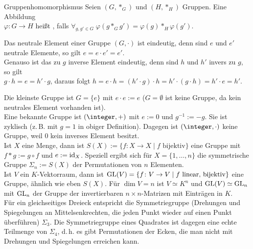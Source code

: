 \begin{Def}{Gruppenhomomorphismus}
    Seien $(G, \ast_G)$ und $(H, \ast_H)$ Gruppen.
    Eine Abbildung\\
    $\varphi\colon G \rightarrow H$ heißt
    , falls $\forall_{g, g' \in G}\;
    \varphi(g \ast_G g') = \varphi(g) \ast_H \varphi(g')$.
\end{Def}

\begin{Bem}
    Das neutrale Element einer Gruppe $(G, \cdot)$ ist eindeutig, denn
    sind $e$ und $e'$ neutrale Elemente, so gilt $e = e \cdot e' = e'$.\\
    Genauso ist das zu $g$ inverse Element eindeutig,
    denn sind $h$ und $h'$ invers zu $g$, so gilt\\
    $g \cdot h = e = h' \cdot g$, daraus folgt
    $h = e \cdot h = (h' \cdot g) \cdot h =
    h' \cdot (g \cdot h) = h' \cdot e = h'$.
\end{Bem}

\linie

\begin{Bsp}
    Die kleinste Gruppe ist $G = \{e\}$ mit $e \cdot e := e$
    ($G = \emptyset$ ist keine Gruppe,
    da kein neutrales Element vorhanden ist).\\
    Eine bekannte Gruppe ist $(\integer, +)$ mit $e := 0$ und $g^{-1} := -g$.
    Sie ist zyklisch (z.\,B. mit $g = 1$ in obiger Definition).
    Dagegen ist $(\integer, \cdot)$ keine Gruppe, weil $0$ kein inverses
    Element besitzt.\\
    Ist $X$ eine Menge, dann ist
    $S(X) := \{f \colon X \rightarrow X \;|\; f\text{ bijektiv}\}$
    eine Gruppe mit $f \ast g := g \circ f$ und $e := \operatorname{id}_X$.
    Speziell ergibt sich für $X = \{1, \dotsc, n\}$ die symmetrische Gruppe
    $\Sigma_n := S(X)$ der Permutationen von $n$ Elementen.\\
    Ist $V$ ein $K$-Vektorraum, dann ist
    $\operatorname{GL}(V) = \{f \colon V \rightarrow V \;|\; f\text{ linear, bijektiv}\}$
    eine Gruppe, ähnlich wie eben $S(X)$.
    Für $\dim V = n$ ist $V \simeq K^n$ und $\operatorname{GL}(V) \simeq \operatorname{GL}_n$
    mit $\operatorname{GL}_n$ der Gruppe der invertierbaren $n \times n$-Matrizen
    mit Einträgen in $K$.\\
    Für ein gleichseitiges Dreieck entspricht die Symmetriegruppe
    (Drehungen und Spiegelungen an Mittelsenkrechten, die jeden Punkt wieder
    auf einen Punkt überführen) $\Sigma_3$.
    Die Symmetriegruppe eines Quadrates ist dagegen eine echte Teilmenge
    von $\Sigma_4$, d.\,h. es gibt Permutationen der Ecken, die man nicht mit
    Drehungen und Spiegelungen erreichen kann.
\end{Bsp}

